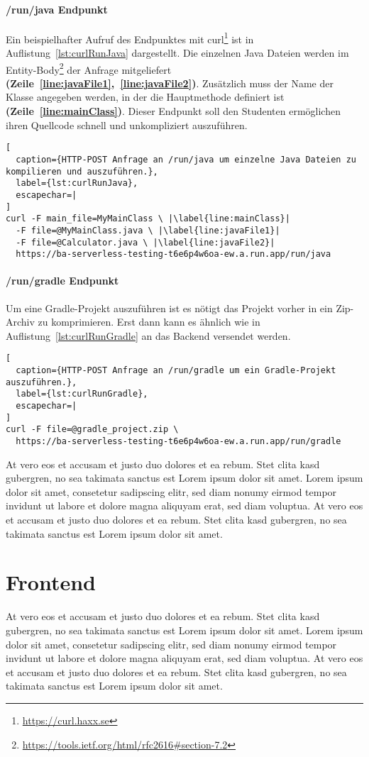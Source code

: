 \paragraph{/run/java Endpunkt} Ein beispielhafter Aufruf des
Endpunktes mit curl\footnote{\url{https://curl.haxx.se}} ist in
Auflistung~\ref{lst:curlRunJava} dargestellt.
Die einzelnen Java Dateien werden im
Entity-Body\footnote{\url{https://tools.ietf.org/html/rfc2616\#section-7.2}}
der Anfrage mitgeliefert
\textbf{(Zeile~\ref{line:javaFile1},~\ref{line:javaFile2})}.
Zusätzlich muss der Name der Klasse
angegeben werden, in der die Hauptmethode definiert ist
\textbf{(Zeile~\ref{line:mainClass})}.
Dieser Endpunkt soll den Studenten ermöglichen ihren Quellcode
schnell und unkompliziert auszuführen.\\

\begin{lstlisting}[
  caption={HTTP-POST Anfrage an /run/java um einzelne Java Dateien zu kompilieren und auszuführen.},
  label={lst:curlRunJava},
  escapechar=|
]
curl -F main_file=MyMainClass \ |\label{line:mainClass}|
  -F file=@MyMainClass.java \ |\label{line:javaFile1}|
  -F file=@Calculator.java \ |\label{line:javaFile2}|
  https://ba-serverless-testing-t6e6p4w6oa-ew.a.run.app/run/java
\end{lstlisting}

\paragraph{/run/gradle Endpunkt} Um eine Gradle-Projekt auszuführen
ist es nötigt das Projekt vorher in ein Zip-Archiv zu komprimieren.
Erst dann kann es ähnlich wie in Auflistung~\ref{lst:curlRunGradle}
an das Backend versendet werden.\\

\begin{lstlisting}[
  caption={HTTP-POST Anfrage an /run/gradle um ein Gradle-Projekt auszuführen.},
  label={lst:curlRunGradle},
  escapechar=|
]
curl -F file=@gradle_project.zip \
  https://ba-serverless-testing-t6e6p4w6oa-ew.a.run.app/run/gradle
\end{lstlisting}

At vero eos et accusam et justo duo dolores et ea rebum. Stet clita kasd gubergren,
no sea takimata sanctus est Lorem ipsum dolor sit amet. Lorem ipsum dolor sit amet,
consetetur sadipscing elitr, sed diam nonumy eirmod tempor invidunt ut labore et
dolore magna aliquyam erat, sed diam voluptua.
At vero eos et accusam et justo duo dolores et ea rebum.
Stet clita kasd gubergren, no sea takimata sanctus est Lorem ipsum dolor sit amet.

\section{Frontend}
At vero eos et accusam et justo duo dolores et ea rebum. Stet clita kasd gubergren,
no sea takimata sanctus est Lorem ipsum dolor sit amet. Lorem ipsum dolor sit amet,
consetetur sadipscing elitr, sed diam nonumy eirmod tempor invidunt ut labore et
dolore magna aliquyam erat, sed diam voluptua.
At vero eos et accusam et justo duo dolores et ea rebum.
Stet clita kasd gubergren, no sea takimata sanctus est Lorem ipsum dolor sit amet.
